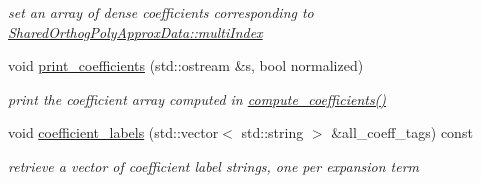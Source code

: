 \begin{DoxyCompactItemize}
\begin{DoxyCompactList}\small\item\em set an array of dense coefficients corresponding to \hyperlink{classPecos_1_1SharedOrthogPolyApproxData_a0fbdd5817bc6dd026f6d42269ca8e703}{Shared\+Orthog\+Poly\+Approx\+Data\+::multi\+Index} \end{DoxyCompactList}\item 
void \hyperlink{classPecos_1_1RegressOrthogPolyApproximation_a4beb4a3300443171ac2233e87c970e39}{print\+\_\+coefficients} (std\+::ostream \&s, bool normalized)\label{classPecos_1_1RegressOrthogPolyApproximation_a4beb4a3300443171ac2233e87c970e39}

\begin{DoxyCompactList}\small\item\em print the coefficient array computed in \hyperlink{classPecos_1_1RegressOrthogPolyApproximation_aef8f0c32bdeff7756a9c614607c03058}{compute\+\_\+coefficients()} \end{DoxyCompactList}\item 
void \hyperlink{classPecos_1_1RegressOrthogPolyApproximation_acbb94332d149ea052464dac73321ddcf}{coefficient\+\_\+labels} (std\+::vector$<$ std\+::string $>$ \&all\+\_\+coeff\+\_\+tags) const \label{classPecos_1_1RegressOrthogPolyApproximation_acbb94332d149ea052464dac73321ddcf}

\begin{DoxyCompactList}\small\item\em retrieve a vector of coefficient label strings, one per expansion term \end{DoxyCompactList}\end{DoxyCompactItemize}
